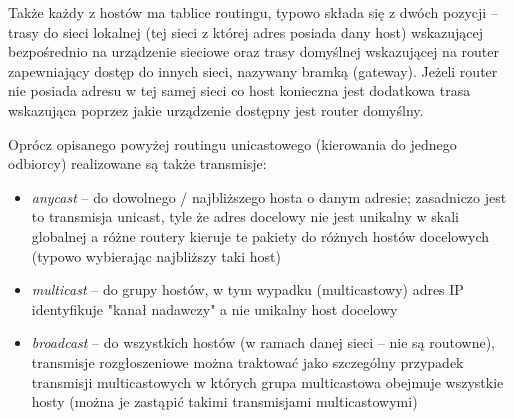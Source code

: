 \documentclass{pdfBooklets}
\begin{document}
Także każdy z hostów ma tablice routingu, typowo składa się z dwóch pozycji – trasy do sieci lokalnej (tej sieci z której adres posiada dany host) wskazującej bezpośrednio na urządzenie sieciowe oraz trasy domyślnej wskazującej na router zapewniający dostęp do innych sieci, nazywany bramką (gateway). Jeżeli router nie posiada adresu w tej samej sieci co host konieczna jest dodatkowa trasa wskazująca poprzez jakie urządzenie dostępny jest router domyślny.

Oprócz opisanego powyżej routingu unicastowego (kierowania do jednego odbiorcy) realizowane są także transmisje:
\begin{itemize}
	\item \emph{anycast} – do dowolnego / najbliższego hosta o danym adresie; zasadniczo jest to transmisja unicast, tyle że adres docelowy nie jest unikalny w skali globalnej a różne routery kieruje te pakiety do różnych hostów docelowych (typowo wybierając najbliższy taki host)
	\item \emph{multicast} – do grupy hostów, w tym wypadku (multicastowy) adres IP identyfikuje "kanał nadawczy" a nie unikalny host docelowy
	\item \emph{broadcast} – do wszystkich hostów (w ramach danej sieci – nie są routowne), transmisje rozgłoszeniowe można traktować jako szczególny przypadek transmisji multicastowych w których grupa multicastowa obejmuje wszystkie hosty (można je zastąpić takimi transmisjami multicastowymi)
\end{itemize}
\end{document}
